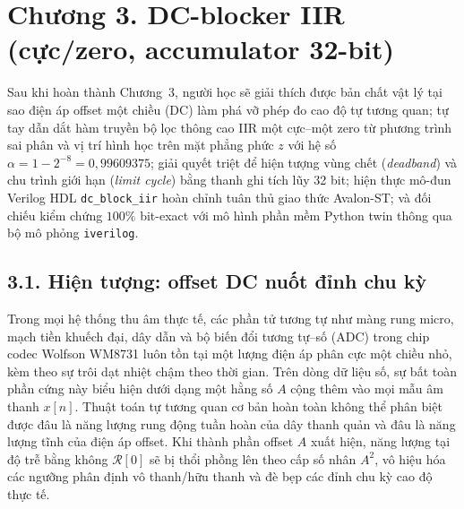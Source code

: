 \clearpage
{}
\section*{Chương 3. DC-blocker IIR (cực/zero, accumulator 32-bit)}

\begin{learningobj}
Sau khi hoàn thành Chương~3, người học sẽ giải thích được bản chất vật lý tại sao điện áp offset một chiều (DC) làm phá vỡ phép đo cao độ tự tương quan; tự tay dẫn dắt hàm truyền bộ lọc thông cao IIR một cực--một zero từ phương trình sai phân và vị trí hình học trên mặt phẳng phức $z$ với hệ số $\alpha = 1 - 2^{-8} = 0{,}99609375$; giải quyết triệt để hiện tượng vùng chết (\emph{deadband}) và chu trình giới hạn (\emph{limit cycle}) bằng thanh ghi tích lũy 32 bit; hiện thực mô-đun Verilog HDL \texttt{dc\_block\_iir} hoàn chỉnh tuân thủ giao thức Avalon-ST; và đối chiếu kiểm chứng $100\%$ bit-exact với mô hình phần mềm Python twin thông qua bộ mô phỏng \texttt{iverilog}.
\end{learningobj}

\subsection*{3.1. Hiện tượng: offset DC nuốt đỉnh chu kỳ}

\begin{physicalinsight}
Trong mọi hệ thống thu âm thực tế, các phần tử tương tự như màng rung micro, mạch tiền khuếch đại, dây dẫn và bộ biến đổi tương tự--số (ADC) trong chip codec Wolfson WM8731 luôn tồn tại một lượng điện áp phân cực một chiều nhỏ, kèm theo sự trôi dạt nhiệt chậm theo thời gian. Trên dòng dữ liệu số, sự bất toàn phần cứng này biểu hiện dưới dạng một hằng số $A$ cộng thêm vào mọi mẫu âm thanh $x[n]$. Thuật toán tự tương quan cơ bản hoàn toàn không thể phân biệt được đâu là năng lượng rung động tuần hoàn của dây thanh quản và đâu là năng lượng tĩnh của điện áp offset. Khi thành phần offset $A$ xuất hiện, năng lượng tại độ trễ bằng không $\mathcal{R}[0]$ sẽ bị thổi phồng lên theo cấp số nhân $A^2$, vô hiệu hóa các ngưỡng phân định vô thanh/hữu thanh và đè bẹp các đỉnh chu kỳ cao độ thực tế.
\end{physicalinsight}

